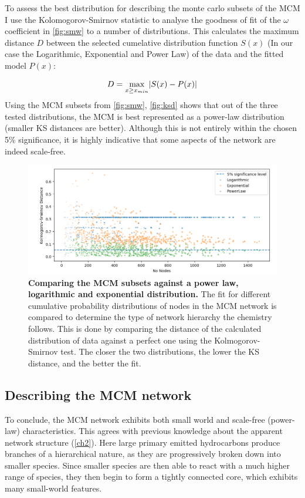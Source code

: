 To assess the best distribution for describing the monte carlo subsets of the MCM I use the Kolomogorov-Smirnov statistic \citep{ks} to analyse the goodness of fit of the $\omega$ coefficient in \autoref{fig:smw} to a number of distributions. This calculates the maximum distance $D$ between the selected cumelative distribution function $S(x)$ (In our case the Logarithmic, Exponential and Power Law) of the data and the fitted model $P(x)$:

\begin{equation}
D = \smash{\displaystyle\max_{x \ge x_{min}}} |{S(x) - P(x)}|
\end{equation}

Using the MCM subsets from \autoref{fig:smw}, \autoref{fig:ksd} shows that out of the three tested distributions, the MCM is best represented as a power-law distribution (smaller KS distances are better). Although this is not entirely within the chosen 5\% significance, it is highly indicative that some aspects of the network are indeed scale-free.

\begin{figure}[H]
     \centering
         \includegraphics[width=\textwidth]{figures_c3/KSdistance.png}
        \caption{\textbf{Comparing the MCM subsets against a power law, logarithmic and exponential distribution.} The fit for different cumulative probability distributions of nodes in the MCM network is compared to determine the type of network hierarchy the chemistry follows. This is done by comparing the distance of the calculated distribution of data against a perfect one using the Kolmogorov-Smirnov test. The closer the two distributions, the lower the KS distance, and the better the fit. }
        \label{fig:ksd}
\end{figure}

\subsection{Describing the MCM network}
To conclude, the MCM network exhibits both small world and scale-free (power-law) characteristics. This agrees with previous knowledge about the apparent network structure (\autoref{ch2}). Here large primary emitted hydrocarbons produce branches of a hierarchical nature, as they are progressively broken down into smaller species. Since smaller species are then able to react with a much higher range of species, they then begin to form a tightly connected core, which exhibits many small-world features. 

